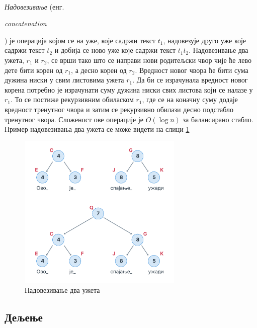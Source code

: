 \documentclass[12pt,oneside]{memoir}
\begin{document}
\paragraph{}
\emph{Надовезивање} (енг. \begin{latinica}\textit{concatenation}\end{latinica}) је
операција којом се на уже, које садржи текст \(t_1\), надовезује друго уже које садржи
текст \(t_2\) и добија се ново уже које садржи текст \(t_1t_2\). Надовезивање два ужета, \(r_1\) и \(r_2\), се врши тако што се направи нови родитељски чвор чије ће лево дете бити
корен од \(r_1\), а десно корен од  \(r_2\). Вредност новог чвора ће бити сума дужина
ниски у свим листовима ужета \(r_1\). Да би се израчунала вредност новог корена потребно је
израчунати суму дужина ниски свих листова који се налазе у \(r_1\). То се постиже
рекурзивним обиласком \(r_1\), где се на коначну суму додаје вредност тренутног чвора и
затим се рекурзивно обилази десно подстабло тренутног чвора. Сложеност ове 
операције је \(O(\log{}n)\) за балансирано стабло. Пример надовезивања два 
ужета се може видети на слици \ref{fig:rope_concat}

\begin{figure}
  \centering
  \includegraphics[width=0.7\textwidth]{images/rope_concat_1.png}
  \caption{Надовезивање два ужета}
  \label{fig:rope_concat}
\end{figure}

\subsection{Дељење}
\end{document}
